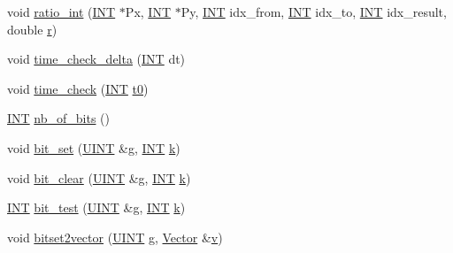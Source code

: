 \begin{DoxyCompactItemize}
\item 
void \mbox{\hyperlink{global_8_c_a7e2f01d86f2af1e4557cf2e8775bf064}{ratio\+\_\+int}} (\mbox{\hyperlink{galois_8h_a09fddde158a3a20bd2dcadb609de11dc}{I\+NT}} $\ast$Px, \mbox{\hyperlink{galois_8h_a09fddde158a3a20bd2dcadb609de11dc}{I\+NT}} $\ast$Py, \mbox{\hyperlink{galois_8h_a09fddde158a3a20bd2dcadb609de11dc}{I\+NT}} idx\+\_\+from, \mbox{\hyperlink{galois_8h_a09fddde158a3a20bd2dcadb609de11dc}{I\+NT}} idx\+\_\+to, \mbox{\hyperlink{galois_8h_a09fddde158a3a20bd2dcadb609de11dc}{I\+NT}} idx\+\_\+result, double \mbox{\hyperlink{alphabet2_8_c_acab531abaa74a7e664e3986f2522b33a}{r}})
\item 
void \mbox{\hyperlink{global_8_c_a89a8565e34c7dcbb97180cd6af7454a1}{time\+\_\+check\+\_\+delta}} (\mbox{\hyperlink{galois_8h_a09fddde158a3a20bd2dcadb609de11dc}{I\+NT}} dt)
\item 
void \mbox{\hyperlink{global_8_c_a04d64356f0c7cb798e55daec998c527e}{time\+\_\+check}} (\mbox{\hyperlink{galois_8h_a09fddde158a3a20bd2dcadb609de11dc}{I\+NT}} \mbox{\hyperlink{translation__plane__main_8_c_a4268f4fe222ffb119218a0199f5e1904}{t0}})
\item 
\mbox{\hyperlink{galois_8h_a09fddde158a3a20bd2dcadb609de11dc}{I\+NT}} \mbox{\hyperlink{global_8_c_ac1e046ce91a84735da2a7fd1fc436865}{nb\+\_\+of\+\_\+bits}} ()
\item 
void \mbox{\hyperlink{global_8_c_adf5071052b9a46f2b8a6ae58dba32798}{bit\+\_\+set}} (\mbox{\hyperlink{galois_8h_a72f3b9c93d14360be2ab10b2cd7f55ec}{U\+I\+NT}} \&g, \mbox{\hyperlink{galois_8h_a09fddde158a3a20bd2dcadb609de11dc}{I\+NT}} \mbox{\hyperlink{simeon_8_c_a43fa990200c3ddd47c35f151bd4d66bf}{k}})
\item 
void \mbox{\hyperlink{global_8_c_a6ebcba000c129f973ec161a4094ad95d}{bit\+\_\+clear}} (\mbox{\hyperlink{galois_8h_a72f3b9c93d14360be2ab10b2cd7f55ec}{U\+I\+NT}} \&g, \mbox{\hyperlink{galois_8h_a09fddde158a3a20bd2dcadb609de11dc}{I\+NT}} \mbox{\hyperlink{simeon_8_c_a43fa990200c3ddd47c35f151bd4d66bf}{k}})
\item 
\mbox{\hyperlink{galois_8h_a09fddde158a3a20bd2dcadb609de11dc}{I\+NT}} \mbox{\hyperlink{global_8_c_a42fc794da6a188c1af7c64b5b1ea2b10}{bit\+\_\+test}} (\mbox{\hyperlink{galois_8h_a72f3b9c93d14360be2ab10b2cd7f55ec}{U\+I\+NT}} \&g, \mbox{\hyperlink{galois_8h_a09fddde158a3a20bd2dcadb609de11dc}{I\+NT}} \mbox{\hyperlink{simeon_8_c_a43fa990200c3ddd47c35f151bd4d66bf}{k}})
\item 
void \mbox{\hyperlink{global_8_c_a65e206c4fdb7b0be920dfcbb43cbfd60}{bitset2vector}} (\mbox{\hyperlink{galois_8h_a72f3b9c93d14360be2ab10b2cd7f55ec}{U\+I\+NT}} g, \mbox{\hyperlink{class_vector}{Vector}} \&\mbox{\hyperlink{simeon_8_c_aeb3f3030944801b163bc3b829a7f6710}{v}})

\end{DoxyCompactItemize}
